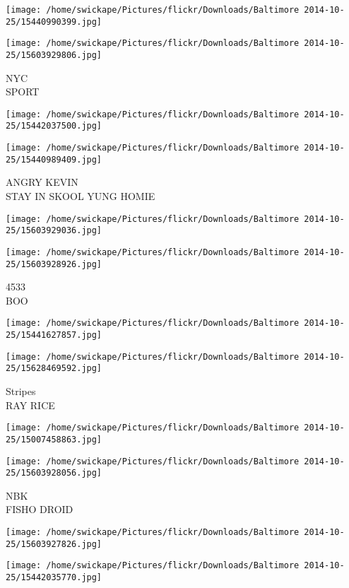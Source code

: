 \documentclass[10pt,letterpaper]{article}
\begin{document}
\texttt{[image: /home/swickape/Pictures/flickr/Downloads/Baltimore 2014-10-25/15440990399.jpg]}

\vspace{0.25in}
\texttt{[image: /home/swickape/Pictures/flickr/Downloads/Baltimore 2014-10-25/15603929806.jpg]}

NYC\\
SPORT
\pagebreak

\texttt{[image: /home/swickape/Pictures/flickr/Downloads/Baltimore 2014-10-25/15442037500.jpg]}

\vspace{0.25in}
\texttt{[image: /home/swickape/Pictures/flickr/Downloads/Baltimore 2014-10-25/15440989409.jpg]}

ANGRY KEVIN\\
STAY IN SKOOL YUNG HOMIE
\pagebreak

\texttt{[image: /home/swickape/Pictures/flickr/Downloads/Baltimore 2014-10-25/15603929036.jpg]}

\vspace{0.25in}
\texttt{[image: /home/swickape/Pictures/flickr/Downloads/Baltimore 2014-10-25/15603928926.jpg]}

4533\\
BOO
\pagebreak

\texttt{[image: /home/swickape/Pictures/flickr/Downloads/Baltimore 2014-10-25/15441627857.jpg]}

\vspace{0.25in}
\texttt{[image: /home/swickape/Pictures/flickr/Downloads/Baltimore 2014-10-25/15628469592.jpg]}

Stripes\\
RAY RICE
\pagebreak

\texttt{[image: /home/swickape/Pictures/flickr/Downloads/Baltimore 2014-10-25/15007458863.jpg]}

\vspace{0.25in}
\texttt{[image: /home/swickape/Pictures/flickr/Downloads/Baltimore 2014-10-25/15603928056.jpg]}

NBK\\
FISHO DROID
\pagebreak

\texttt{[image: /home/swickape/Pictures/flickr/Downloads/Baltimore 2014-10-25/15603927826.jpg]}

\vspace{0.25in}
\texttt{[image: /home/swickape/Pictures/flickr/Downloads/Baltimore 2014-10-25/15442035770.jpg]}
\end{document}
